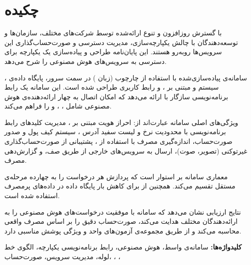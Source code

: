 \chapter*{چکیده}

با گسترش روزافزون  و تنوع
ارائه‌شده توسط شرکت‌های مختلف، سازمان‌ها و توسعه‌دهندگان با چالش
یکپارچه‌سازی، مدیریت دسترسی و صورت‌حساب‌گذاری این سرویس‌ها روبه‌رو هستند.
این پایان‌نامه طراحی و پیاده‌سازی یک  یکپارچه
برای دسترسی به سرویس‌های هوش مصنوعی را شرح می‌دهد.

سامانه‌ی پیاده‌سازی‌شده با استفاده از چارچوب  (زبان ) در
سمت سرور، پایگاه داده‌ی ، سیستم  و
 مبتنی بر ، و رابط کاربری  طراحی شده
است. این سامانه یک رابط برنامه‌نویسی سازگار با  ارائه می‌دهد که
امکان اتصال به چهار ارائه‌دهنده‌ی هوش مصنوعی شامل ، ،
 و  را فراهم می‌کند.

ویژگی‌های اصلی سامانه عبارت‌اند از: احراز هویت مبتنی بر
، مدیریت کلیدهای رابط
برنامه‌نویسی با محدودیت نرخ و لیست سفید آدرس ، سیستم کیف پول و صدور
صورت‌حساب، اندازه‌گیری مصرف  با استفاده از
، پشتیبانی از صورت‌حساب‌گذاری غیرتوکنی
(تصویر، صوت)، ارسال  به سرویس‌های خارجی از طریق صف، و
گزارش‌دهی مصرف.

معماری سامانه بر  استوار است که
پردازش هر درخواست را به چهارده مرحله‌ی مستقل تقسیم می‌کند. همچنین از
 برای کاهش بار پایگاه داده در
داده‌های پرمصرف استفاده شده است.

نتایج ارزیابی نشان می‌دهد که سامانه با موفقیت درخواست‌های هوش مصنوعی را
به ارائه‌دهندگان مختلف هدایت می‌کند، صورت‌حساب دقیق را بر اساس مصرف واقعی
محاسبه می‌کند و از طریق مجموعه‌ی آزمون‌های واحد و ویژگی پوشش مناسبی دارد.

\vspace{1cm}
\noindent\textbf{کلیدواژه‌ها:}
سامانه‌ی واسط، هوش مصنوعی، رابط برنامه‌نویسی یکپارچه، الگوی خط لوله،
مدیریت سرویس، صورت‌حساب، ، ، 

\cleardoublepage
